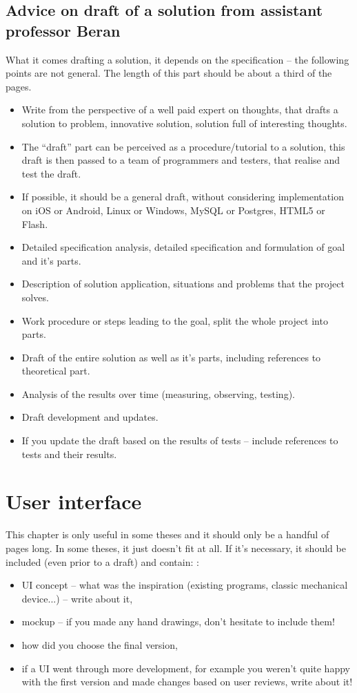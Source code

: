 {{\subsection*{Advice on draft of a solution from assistant professor Beran}

What it comes drafting a solution, it depends on the specification -- the following points are not general. The length of this part should be about a third of the pages.
\begin{itemize}
  \item{Write from the perspective of a well paid expert on thoughts, that drafts a solution to problem, innovative solution, solution full of interesting thoughts.}
  \item{The ``draft'' part can be perceived as a procedure/tutorial to a solution, this draft is then passed to a team of programmers and testers, that realise and test the draft.}
  \item{If possible, it should be a general draft, without considering implementation on iOS or Android, Linux or Windows, MySQL or Postgres, HTML5 or Flash.}
  \item{Detailed specification analysis, detailed specification and formulation of goal and it's parts.}
  \item{Description of solution application, situations and problems that the project solves.}
  \item{Work procedure or steps leading to the goal, split the whole project into parts.}
  \item{Draft of the entire solution as well as it's parts, including references to theoretical part.}
  \item{Analysis of the results over time (measuring, observing, testing).}
  \item{Draft development and updates.}
  \item{If you update the draft based on the results of tests -- include references to tests and their results.}
\end{itemize}

\section{User interface}

This chapter is only useful in some theses and it should only be a handful of pages long. In some theses, it just doesn't fit at all. If it's necessary, it should be included (even prior to a draft) and contain: \cite{Cernocky}:
\begin{itemize}
  \item{UI concept -- what was the inspiration (existing programs, classic mechanical device...) -- write about it,}
  \item{mockup -- if you made any hand drawings, don't hesitate to include them!}
  \item{how did you choose the final version,}
  \item{if a UI went through more development, for example you weren't quite happy with the first version and made changes based on user reviews, write about it!}
\end{itemize}


}}

